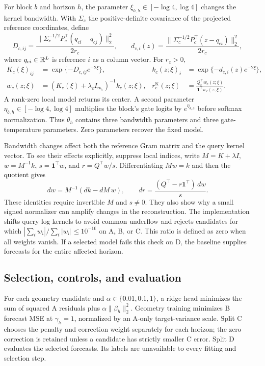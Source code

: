 For block $b$ and horizon $h$, the parameter
$\xi_{b,h}\in[-\log4,\log4]$ changes the kernel bandwidth. With
$\Sigma_c$ the positive-definite covariance of the projected reference
coordinates, define
\[
 D_{c,ij}=\frac{\|\Sigma_c^{-1/2}P_c^\top(q_{ci}-q_{cj})\|_2^2}{2r_c},
 \qquad
 d_{c,i}(z)=\frac{\|\Sigma_c^{-1/2}P_c^\top(z-q_{ci})\|_2^2}{2r_c},
\]
where $q_{ci}\in\mathbb{R}^L$ is reference $i$ as a column vector. For $r_c>0$,
\begin{align}
 K_c(\xi)_{ij}&=\exp\{-D_{c,ij}e^{-2\xi}\},&
 k_c(z;\xi)_i&=\exp\{-d_{c,i}(z)e^{-2\xi}\},\nonumber\\
 w_c(z;\xi)&=(K_c(\xi)+\lambda_c I_{m_c})^{-1}k_c(z;\xi),&
 r_c^{\mathrm{K}}(z;\xi)&=
 \frac{Q_c^\top w_c(z;\xi)}{\mathbf1^\top w_c(z;\xi)}.
 \label{eq:direct-kahm}
\end{align}
A rank-zero local model returns its center. A second parameter
$\eta_{b,h}\in[-\log4,\log4]$ multiplies the block's gate logits by
$e^{\eta_{b,h}}$ before softmax normalization. Thus $\theta_h$ contains
three bandwidth parameters and three gate-temperature parameters.
Zero parameters recover the fixed model.

Bandwidth changes affect both the reference Gram matrix and the query
kernel vector. To see their effects explicitly, suppress local indices,
write $M=K+\lambda I$, $w=M^{-1}k$, $s=\mathbf1^\top w$, and
$r=Q^\top w/s$. Differentiating $Mw=k$ and then the quotient gives
\begin{equation}
 dw=M^{-1}(dk-dM\,w),\qquad
 dr=\frac{(Q^\top-r\mathbf1^\top)\,dw}{s}.
 \label{eq:direct-derivative}
\end{equation}
These identities require invertible $M$ and $s\ne0$. They also show why
a small signed normalizer can amplify changes in the reconstruction.
The implementation shifts query log kernels to avoid common underflow
and rejects candidates for which
$|\sum_i w_i|/\sum_i|w_i|\leq10^{-10}$ on A, B, or C. This ratio
is defined as zero when all weights vanish. If a selected model fails this check on D, the
baseline supplies forecasts for the entire affected horizon.

\subsection{Selection, controls, and evaluation}

For each geometry candidate and $\alpha\in\{0.01,0.1,1\}$, a ridge
head minimizes the sum of squared A residuals plus
$\alpha\|\beta_h\|_2^2$. Geometry training minimizes B forecast MSE
at $\gamma_h=1$, normalized by an A-only target-variance scale.
Split C chooses the penalty and correction weight separately for each
horizon; the zero correction is retained unless a candidate has strictly
smaller C error. Split D evaluates the selected forecasts. Its labels
are unavailable to every fitting and selection step.

